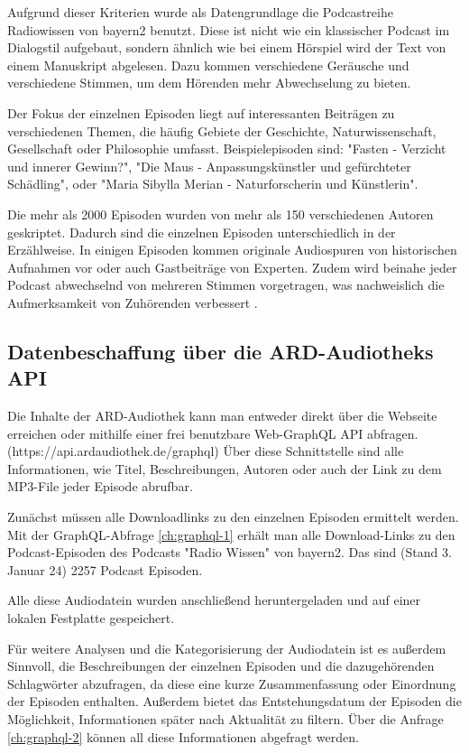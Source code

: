 Aufgrund dieser Kriterien wurde als Datengrundlage die Podcastreihe Radiowissen von bayern2 benutzt. 
Diese ist nicht wie ein klassischer Podcast im Dialogstil aufgebaut, sondern ähnlich wie bei einem Hörspiel wird der Text von einem Manuskript abgelesen. 
Dazu kommen verschiedene Geräusche und verschiedene Stimmen, um dem Hörenden mehr Abwechselung zu bieten.

Der Fokus der einzelnen Episoden liegt auf interessanten Beiträgen zu verschiedenen Themen, die häufig Gebiete der Geschichte, Naturwissenschaft, Gesellschaft oder Philosophie umfasst.
Beispielepisoden sind: "Fasten - Verzicht und innerer Gewinn?", "Die Maus - Anpassungskünstler und gefürchteter Schädling", oder "Maria Sibylla Merian - Naturforscherin und Künstlerin".

Die mehr als 2000 Episoden wurden von mehr als 150 verschiedenen Autoren geskriptet.
Dadurch sind die einzelnen Episoden unterschiedlich in der Erzählweise.
In einigen Episoden kommen originale Audiospuren von historischen Aufnahmen vor oder auch Gastbeiträge von Experten. 
Zudem wird beinahe jeder Podcast abwechselnd von mehreren Stimmen vorgetragen, was nachweislich die Aufmerksamkeit von Zuhörenden verbessert \cite{kang2012}.

\subsection{Datenbeschaffung über die ARD-Audiotheks API}

Die Inhalte der ARD-Audiothek kann man entweder direkt über die Webseite erreichen oder mithilfe einer frei benutzbare Web-GraphQL API abfragen.
(https://api.ardaudiothek.de/graphql) 
Über diese Schnittstelle sind alle Informationen, wie Titel, Beschreibungen, Autoren oder auch der Link zu dem MP3-File jeder Episode abrufbar.

Zunächst müssen alle Downloadlinks zu den einzelnen Episoden ermittelt werden.
Mit der GraphQL-Abfrage \autoref{ch:graphql-1} erhält man alle Download-Links zu den Podcast-Episoden des Podcasts "Radio Wissen" von bayern2.
Das sind (Stand 3. Januar 24) 2257 Podcast Episoden.

Alle diese Audiodatein wurden anschließend heruntergeladen und auf einer lokalen Festplatte gespeichert.

Für weitere Analysen und die Kategorisierung der Audiodatein ist es außerdem Sinnvoll, die Beschreibungen der einzelnen Episoden und die dazugehörenden Schlagwörter abzufragen, da diese eine kurze Zusammenfassung oder Einordnung der Episoden enthalten.
Außerdem bietet das Entstehungsdatum der Episoden die Möglichkeit, Informationen später nach Aktualität zu filtern.
Über die Anfrage \autoref{ch:graphql-2} können all diese Informationen abgefragt werden.

